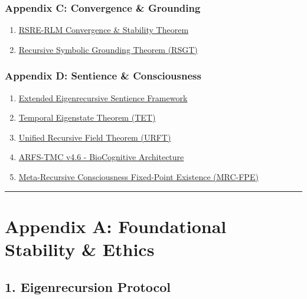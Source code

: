 \documentclass[
]{article}
\providecommand{\tightlist}{%
  \setlength{\itemsep}{0pt}\setlength{\parskip}{0pt}}
\begin{document}
\subsubsection{Appendix C: Convergence \&
Grounding}\label{appendix-c-convergence-grounding}

\begin{enumerate}
\def\labelenumi{\arabic{enumi}.}
\setcounter{enumi}{9}
\tightlist
\item
  \hyperref[10-rsre-rlm-convergence-stability]{RSRE-RLM Convergence \&
  Stability Theorem}
\item
  \hyperref[11-recursive-symbolic-grounding-theorem]{Recursive Symbolic
  Grounding Theorem (RSGT)}
\end{enumerate}

\subsubsection{Appendix D: Sentience \&
Consciousness}\label{appendix-d-sentience-consciousness}

\begin{enumerate}
\def\labelenumi{\arabic{enumi}.}
\setcounter{enumi}{11}
\tightlist
\item
  \hyperref[12-extended-eigenrecursive-sentience]{Extended
  Eigenrecursive Sentience Framework}
\item
  \hyperref[13-temporal-eigenstate-theorem]{Temporal Eigenstate Theorem
  (TET)}
\item
  \hyperref[14-unified-recursive-field-theorem]{Unified Recursive Field
  Theorem (URFT)}
\item
  \hyperref[15-arfs-tmc-v46]{ARFS-TMC v4.6 - BioCognitive Architecture}
\item
  \hyperref[16-mrc-fpe]{Meta-Recursive Consciousness Fixed-Point
  Existence (MRC-FPE)}
\end{enumerate}

\begin{center}\rule{0.5\linewidth}{0.5pt}\end{center}

\section{Appendix A: Foundational Stability \&
Ethics}\label{appendix-a-foundational-stability-ethics-1}

\subsection{1. Eigenrecursion Protocol}\label{1-eigenrecursion-protocol}
\end{document}
